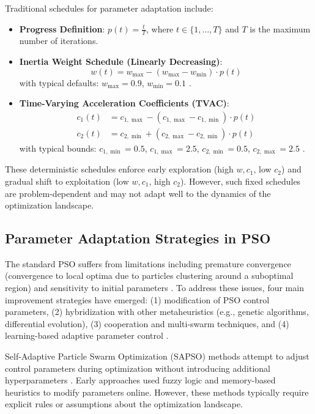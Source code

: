 Traditional schedules for parameter adaptation include:

\begin{itemize}
\item \textbf{Progress Definition}: $p(t) = \frac{t}{T}$, where $t \in \{1, \ldots, T\}$ and $T$ is the maximum number of iterations.

\item \textbf{Inertia Weight Schedule (Linearly Decreasing)}:
\begin{equation}
w(t) = w_{\max} - (w_{\max} - w_{\min}) \cdot p(t)
\end{equation}
with typical defaults: $w_{\max} = 0.9$, $w_{\min} = 0.1$ \cite{ShiEberhart1998}.

\item \textbf{Time-Varying Acceleration Coefficients (TVAC)}:
\begin{align}
c_1(t) &= c_{1,\max} - (c_{1,\max} - c_{1,\min}) \cdot p(t) \\
c_2(t) &= c_{2,\min} + (c_{2,\max} - c_{2,\min}) \cdot p(t)
\end{align}
with typical bounds: $c_{1,\min} = 0.5$, $c_{1,\max} = 2.5$, $c_{2,\min} = 0.5$, $c_{2,\max} = 2.5$ \cite{Ratnaweera2004}.
\end{itemize}

These deterministic schedules enforce early exploration (high $w, c_1$, low $c_2$) and gradual shift to exploitation (low $w, c_1$, high $c_2$). However, such fixed schedules are problem-dependent and may not adapt well to the dynamics of the optimization landscape.

\subsection*{Parameter Adaptation Strategies in PSO}
\label{subsec:parameter_adaptation}

The standard PSO suffers from limitations including premature convergence (convergence to local optima due to particles clustering around a suboptimal region) and sensitivity to initial parameters \cite{Bonyadi2015}. To address these issues, four main improvement strategies have emerged: (1) modification of PSO control parameters, (2) hybridization with other metaheuristics (e.g., genetic algorithms, differential evolution), (3) cooperation and multi-swarm techniques, and (4) learning-based adaptive parameter control \cite{Bonyadi2015}.

Self-Adaptive Particle Swarm Optimization (SAPSO) methods attempt to adjust control parameters during optimization without introducing additional hyperparameters \cite{Engelbrecht2010}. Early approaches used fuzzy logic and memory-based heuristics to modify parameters online. However, these methods typically require explicit rules or assumptions about the optimization landscape.

